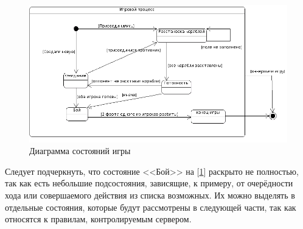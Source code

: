 \begin{figure}[ht]
\centering
\includegraphics[width=18cm]{images/statecl.png}
\caption{Диаграмма состояний игры}
\label{fig12}
\end{figure}


Следует подчеркнуть, что состояние <<Бой>> на [\ref{fig12}] раскрыто не полностью, так как есть небольшие подсостояния, зависящие, к примеру, от очерёдности хода или совершаемого действия из списка возможных. Их можно выделять в отдельные состояния, которые будут рассмотрены в следующей части, так как относятся к правилам, контролируемым сервером. 
\endinput
